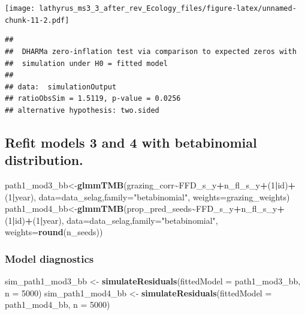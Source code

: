 \documentclass[
]{article}
\newenvironment{Shaded}{\begin{snugshade}}{\end{snugshade}}
\newcommand{\DataTypeTok}[1]{\textcolor[rgb]{0.13,0.29,0.53}{#1}}
\newcommand{\DecValTok}[1]{\textcolor[rgb]{0.00,0.00,0.81}{#1}}
\newcommand{\KeywordTok}[1]{\textcolor[rgb]{0.13,0.29,0.53}{\textbf{#1}}}
\newcommand{\NormalTok}[1]{#1}
\newcommand{\OperatorTok}[1]{\textcolor[rgb]{0.81,0.36,0.00}{\textbf{#1}}}
\newcommand{\StringTok}[1]{\textcolor[rgb]{0.31,0.60,0.02}{#1}}
\begin{document}
\texttt{[image: lathyrus\_ms3\_3\_after\_rev\_Ecology\_files/figure-latex/unnamed-chunk-11-2.pdf]}

\begin{verbatim}
## 
##  DHARMa zero-inflation test via comparison to expected zeros with
##  simulation under H0 = fitted model
## 
## data:  simulationOutput
## ratioObsSim = 1.5119, p-value = 0.0256
## alternative hypothesis: two.sided
\end{verbatim}

\hypertarget{refit-models-3-and-4-with-betabinomial-distribution.}{%
\subsection{Refit models 3 and 4 with betabinomial
distribution.}\label{refit-models-3-and-4-with-betabinomial-distribution.}}

\begin{Shaded}
\begin{Highlighting}[]
\NormalTok{path1\_mod3\_bb\textless{}{-}}\KeywordTok{glmmTMB}\NormalTok{(grazing\_corr}\OperatorTok{\textasciitilde{}}\NormalTok{FFD\_s\_y}\OperatorTok{+}\NormalTok{n\_fl\_s\_y}\OperatorTok{+}\NormalTok{(}\DecValTok{1}\OperatorTok{|}\NormalTok{id)}\OperatorTok{+}\NormalTok{(}\DecValTok{1}\OperatorTok{|}\NormalTok{year),}
                            \DataTypeTok{data=}\NormalTok{data\_selag,}\DataTypeTok{family=}\StringTok{"betabinomial"}\NormalTok{,}
                            \DataTypeTok{weights=}\NormalTok{grazing\_weights)}
\NormalTok{path1\_mod4\_bb\textless{}{-}}\KeywordTok{glmmTMB}\NormalTok{(prop\_pred\_seeds}\OperatorTok{\textasciitilde{}}\NormalTok{FFD\_s\_y}\OperatorTok{+}\NormalTok{n\_fl\_s\_y}\OperatorTok{+}\NormalTok{(}\DecValTok{1}\OperatorTok{|}\NormalTok{id)}\OperatorTok{+}\NormalTok{(}\DecValTok{1}\OperatorTok{|}\NormalTok{year),}
                            \DataTypeTok{data=}\NormalTok{data\_selag,}\DataTypeTok{family=}\StringTok{"betabinomial"}\NormalTok{,}
                            \DataTypeTok{weights=}\KeywordTok{round}\NormalTok{(n\_seeds))}
\end{Highlighting}
\end{Shaded}

\hypertarget{model-diagnostics-1}{%
\subsubsection{Model diagnostics}\label{model-diagnostics-1}}

\begin{Shaded}
\begin{Highlighting}[]
\NormalTok{sim\_path1\_mod3\_bb \textless{}{-}}\StringTok{ }\KeywordTok{simulateResiduals}\NormalTok{(}\DataTypeTok{fittedModel =}\NormalTok{ path1\_mod3\_bb, }\DataTypeTok{n =} \DecValTok{5000}\NormalTok{) }
\NormalTok{sim\_path1\_mod4\_bb \textless{}{-}}\StringTok{ }\KeywordTok{simulateResiduals}\NormalTok{(}\DataTypeTok{fittedModel =}\NormalTok{ path1\_mod4\_bb, }\DataTypeTok{n =} \DecValTok{5000}\NormalTok{) }
\end{Highlighting}
\end{Shaded}
\end{document}
